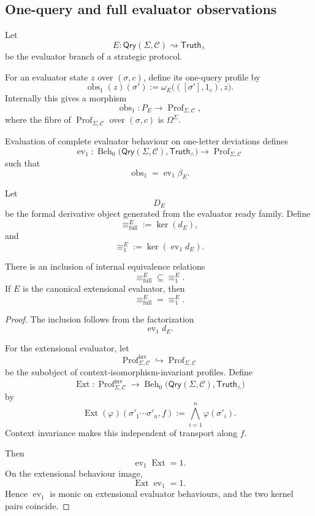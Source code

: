 \subsection{One-query and full evaluator observations}

Let
\[
  E:
  \mathsf{Qry}(\Sigma,\mathcal C)
  \rightsquigarrow
  \mathsf{Truth}_\wedge
\]
be the evaluator branch of a strategic protocol.

For an evaluator state \(z\) over \((\sigma,c)\), define its one-query profile by
\[
  \operatorname{obs}_1(z)(\sigma')
  :=
  \omega_E
  \bigl(
    ([\sigma'],1_c),
    z
  \bigr).
\]
Internally this gives a morphism
\[
  \operatorname{obs}_1:
  P_E
  \longrightarrow
  \operatorname{Prof}_{\Sigma,\mathcal C},
\]
where the fibre of
\(\operatorname{Prof}_{\Sigma,\mathcal C}\) over \((\sigma,c)\) is \(\Omega^\Sigma\).

Evaluation of complete evaluator behaviour on one-letter deviations defines
\[
  \operatorname{ev}_1:
  \operatorname{Beh}_0
  \bigl(
    \mathsf{Qry}(\Sigma,\mathcal C),
    \mathsf{Truth}_\wedge
  \bigr)
  \longrightarrow
  \operatorname{Prof}_{\Sigma,\mathcal C}
\]
such that
\[
  \operatorname{obs}_1
  =
  \operatorname{ev}_1\beta_E.
\]

Let
\[
  D_E
\]
be the formal derivative object generated from the evaluator ready family. Define
\[
  \equiv^E_{\mathrm{full}}
  :=
  \ker(d_E),
\]
and
\[
  \equiv^E_1
  :=
  \ker(\operatorname{ev}_1d_E).
\]

\begin{proposition}
\label{prop:one-query-comparison}
There is an inclusion of internal equivalence relations
\[
  \equiv^E_{\mathrm{full}}
  \subseteq
  \equiv^E_1.
\]
If \(E\) is the canonical extensional evaluator, then
\[
  \equiv^E_{\mathrm{full}}
  =
  \equiv^E_1.
\]
\end{proposition}

\begin{proof}
The inclusion follows from the factorization
\[
  \operatorname{ev}_1d_E.
\]

For the extensional evaluator, let
\[
  \operatorname{Prof}^{\mathrm{inv}}_{\Sigma,\mathcal C}
  \hookrightarrow
  \operatorname{Prof}_{\Sigma,\mathcal C}
\]
be the subobject of context-isomorphism-invariant profiles. Define
\[
  \operatorname{Ext}:
  \operatorname{Prof}^{\mathrm{inv}}_{\Sigma,\mathcal C}
  \longrightarrow
  \operatorname{Beh}_0
  \bigl(
    \mathsf{Qry}(\Sigma,\mathcal C),
    \mathsf{Truth}_\wedge
  \bigr)
\]
by
\[
  \operatorname{Ext}(\varphi)(\sigma'_1\cdots\sigma'_n,f)
  :=
  \bigwedge_{i=1}^{n}\varphi(\sigma'_i).
\]
Context invariance makes this independent of transport along \(f\).

Then
\[
  \operatorname{ev}_1\operatorname{Ext}
  =
  1.
\]
On the extensional behaviour image,
\[
  \operatorname{Ext}\operatorname{ev}_1
  =
  1.
\]
Hence \(\operatorname{ev}_1\) is monic on extensional evaluator behaviours, and the two kernel pairs
coincide.
\end{proof}

